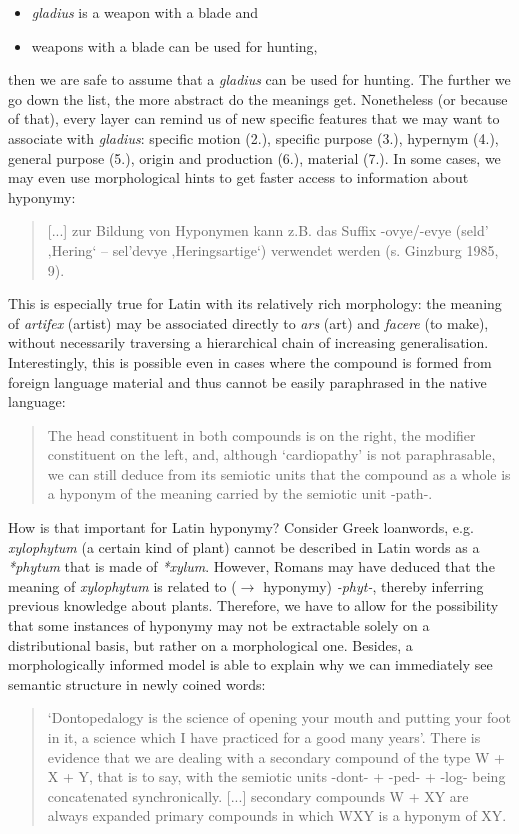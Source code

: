 \documentclass[jou]{apa6} %
\begin{document}
\begin{itemize}
         \item \textit{gladius} is a weapon with a blade and
         \item weapons with a blade can be used for hunting,
\end{itemize}
then we are safe to assume that a \textit{gladius} can be used for hunting. The further we go down the list, the more abstract do the meanings get. Nonetheless (or because of that), every layer can remind us of new specific features that we may want to associate with \textit{gladius}: specific motion (2.), specific purpose (3.), hypernym (4.), general purpose (5.), origin and production (6.), material (7.). In some cases, we may even use morphological hints to get faster access to information about hyponymy:
\blockquote[{\cite[p.~913]{anstattTypenSemantischerRelationen2009}}]{[...] zur Bildung von Hyponymen kann z.B. das Suffix -ovye/-evye (seld’ ‚Hering‘ – sel’devye ‚Heringsartige‘) verwendet werden (s. Ginzburg 1985, 9).}
This is especially true for Latin with its relatively rich morphology: the meaning of \textit{artifex} (artist) may be associated directly to \textit{ars} (art) and \textit{facere} (to make), without necessarily traversing a hierarchical chain of increasing generalisation. Interestingly, this is possible even in cases where the compound is formed from foreign language material and thus cannot be easily paraphrased in the native language:
\blockquote[{\cite[p.~33]{souille-rigautSemanticAccountQuasiLexemes2010}}]{The head constituent in both compounds is on the right, the modifier constituent on the left, and, although ‘cardiopathy’ is not paraphrasable, we can still deduce from its semiotic units that the compound as a whole is a hyponym of the meaning carried by the semiotic unit -path-.}
How is that important for Latin hyponymy? Consider Greek loanwords, e.g. \textit{xylophytum} (a certain kind of plant) cannot be described in Latin words as a \textit{*phytum} that is made of \textit{*xylum}. However, Romans may have deduced that the meaning of \textit{xylophytum} is related to ($\rightarrow$ hyponymy) \textit{-phyt-}, thereby inferring previous knowledge about plants. Therefore, we have to allow for the possibility that some instances of hyponymy may not be extractable solely on a distributional basis, but rather on a morphological one. Besides, a morphologically informed model is able to explain why we can immediately see semantic structure in newly coined words:
\blockquote[{\cite[p.~43]{souille-rigautSemanticAccountQuasiLexemes2010}}]{‘Dontopedalogy is the science of opening your mouth and putting your foot in it, a science which I have practiced for a good many years’. There is evidence that we are dealing with a secondary compound of the type W + X + Y, that is to say, with the semiotic units -dont- + -ped- + -log- being concatenated synchronically. [...] secondary compounds W + XY are always expanded primary compounds in which WXY is a hyponym of XY.}
\end{document}
